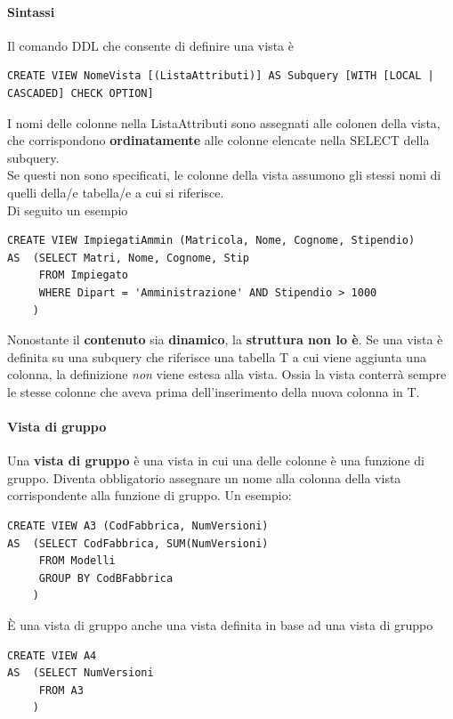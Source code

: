 \documentclass[10pt]{book}
\begin{document}
\paragraph{Sintassi} Il comando DDL che consente di definire una vista è 
\begin{lstlisting}
CREATE VIEW NomeVista [(ListaAttributi)] AS Subquery [WITH [LOCAL | CASCADED] CHECK OPTION]
\end{lstlisting}
I nomi delle colonne nella ListaAttributi sono assegnati alle colonen della vista, che corrispondono \textbf{ordinatamente} alle colonne elencate nella SELECT della subquery.\\
Se questi non sono specificati, le colonne della vista assumono gli stessi nomi di quelli della/e tabella/e a cui si riferisce.\\
Di seguito un esempio
\begin{lstlisting}
CREATE VIEW ImpiegatiAmmin (Matricola, Nome, Cognome, Stipendio)
AS	(SELECT Matri, Nome, Cognome, Stip
	 FROM Impiegato
	 WHERE Dipart = 'Amministrazione' AND Stipendio > 1000
	)
\end{lstlisting}
Nonostante il \textbf{contenuto} sia \textbf{dinamico}, la \textbf{struttura non lo è}. Se una vista è definita su una subquery che riferisce una tabella T a cui viene aggiunta una colonna, la definizione \textit{non} viene estesa alla vista. Ossia la vista conterrà sempre le stesse colonne che aveva prima dell'inserimento della nuova colonna in T.
\paragraph{Vista di gruppo} Una \textbf{vista di gruppo} è una vista in cui una delle colonne è una funzione di gruppo. Diventa obbligatorio assegnare un nome alla colonna della vista corrispondente alla funzione di gruppo. Un esempio:
\begin{lstlisting}
CREATE VIEW A3 (CodFabbrica, NumVersioni)
AS	(SELECT CodFabbrica, SUM(NumVersioni)
	 FROM Modelli
	 GROUP BY CodBFabbrica
	)
\end{lstlisting}
È una vista di gruppo anche una vista definita in base ad una vista di gruppo
\begin{lstlisting}
CREATE VIEW A4
AS	(SELECT NumVersioni
	 FROM A3
	)
\end{lstlisting}
\end{document}
